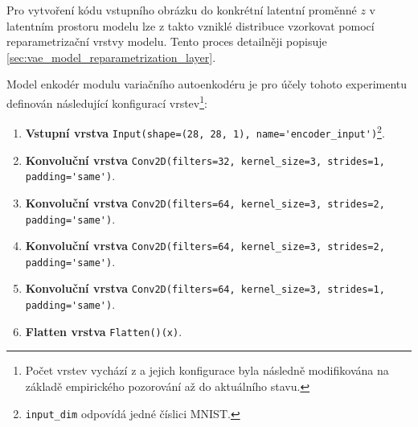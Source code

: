 Pro vytvoření kódu vstupního obrázku do konkrétní latentní proměnné $z$ v latentním prostoru modelu lze z takto vzniklé distribuce vzorkovat pomocí reparametrizační vrstvy modelu. Tento proces detailněji popisuje \autoref{sec:vae_model_reparametrization_layer}.

Model enkodér modulu variačního autoenkodéru je pro účely tohoto experimentu definován následující konfigurací vrstev\footnote{Počet vrstev vychází z \textcite{Kingma2014} a jejich konfigurace byla následně modifikována na základě empirického pozorování až do aktuálního stavu.}:
\newpage
\begin{enumerate}
    \item \textbf{Vstupní vrstva} \lstinline{Input(shape=(28, 28, 1), name='encoder_input')}\footnote{\lstinline{input_dim} odpovídá jedné číslici MNIST.}.
    \item \textbf{Konvoluční vrstva} \lstinline{Conv2D(filters=32, kernel_size=3, strides=1, padding='same')}.
    \item \textbf{Konvoluční vrstva} \lstinline{Conv2D(filters=64, kernel_size=3, strides=2, padding='same')}.
    \item \textbf{Konvoluční vrstva} \lstinline{Conv2D(filters=64, kernel_size=3, strides=2, padding='same')}.
    \item \textbf{Konvoluční vrstva} \lstinline{Conv2D(filters=64, kernel_size=3, strides=1, padding='same')}.
    \item \textbf{Flatten vrstva} \lstinline{Flatten()(x)}.
\end{enumerate}

